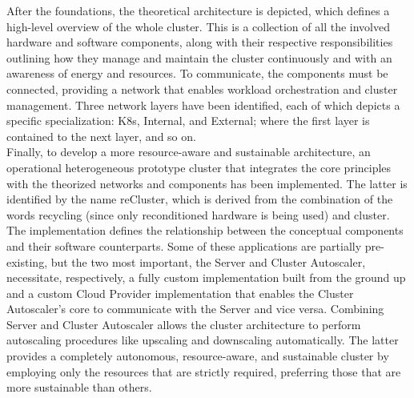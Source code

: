 After the foundations, the theoretical architecture is depicted, which defines a
high-level overview of the whole cluster. This is a collection of all the
involved hardware and software components, along with their respective responsibilities
outlining how they manage and maintain the cluster continuously and with an awareness
of energy and resources. To communicate, the components must be connected,
providing a network that enables workload orchestration and cluster management. Three
network layers have been identified, each of which depicts a specific
specialization: K8s, Internal, and External; where the first layer is contained
to the next layer, and so on. \\ %

Finally, to develop a more resource-aware and sustainable architecture, an
operational heterogeneous prototype cluster that integrates the core principles
with the theorized networks and components has been implemented. The latter is identified
by the name reCluster, which is derived from the combination of the words
recycling (since only reconditioned hardware is being used) and cluster. The implementation
defines the relationship between the conceptual components and their software counterparts.
Some of these applications are partially pre-existing, but the two most important,
the Server and Cluster Autoscaler, necessitate, respectively, a fully custom implementation
built from the ground up and a custom Cloud Provider implementation that enables
the Cluster Autoscaler's core to communicate with the Server and vice versa.
Combining Server and Cluster Autoscaler allows the cluster architecture to
perform autoscaling procedures like upscaling and downscaling automatically. The
latter provides a completely autonomous, resource-aware, and sustainable cluster
by employing only the resources that are strictly required, preferring those
that are more sustainable than others.